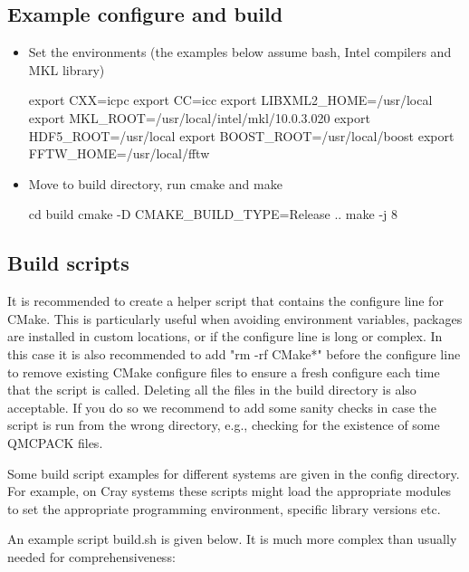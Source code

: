 \subsection{Example configure and build}
\begin{itemize}
\item Set the environments (the examples below assume bash, Intel compilers and MKL library)

\begin{shade}
export CXX=icpc
export CC=icc
export LIBXML2_HOME=/usr/local
export MKL_ROOT=/usr/local/intel/mkl/10.0.3.020
export HDF5_ROOT=/usr/local
export BOOST_ROOT=/usr/local/boost
export FFTW_HOME=/usr/local/fftw
\end{shade}

\item Move to build directory, run cmake and make

\begin{shade}
cd build
cmake -D CMAKE_BUILD_TYPE=Release ..
make -j 8
\end{shade}
\end{itemize}

\subsection{Build scripts}
It is recommended to create a helper script that contains the
configure line for CMake.  This is particularly useful when avoiding
environment variables, packages are installed in custom locations,
or if the configure line is long or complex.  In this case it is also
recommended to add "rm -rf CMake*" before the configure line to remove
existing CMake configure files to ensure a fresh configure each time
that the script is called. Deleting all the files in the build
directory is also acceptable. If you do so we recommend to add some sanity
checks in case the script is run from the wrong directory, e.g.,
checking for the existence of some QMCPACK files.

Some build script examples for different systems are given in the
config directory. For example, on Cray systems these scripts might
load the appropriate modules to set the appropriate programming
environment, specific library versions etc.

An example script build.sh is given below. It is much more complex
than usually needed for comprehensiveness:




